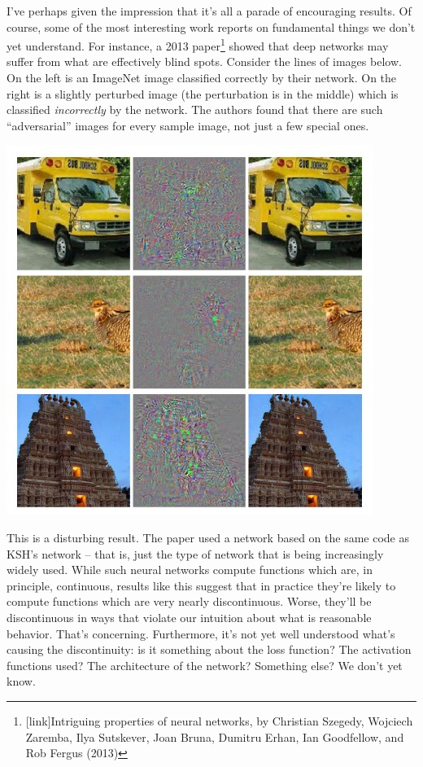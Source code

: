 \documentclass[a4paper,twoside,10pt]{book}
\begin{document}
I've perhaps given the impression that it's all a parade of encouraging results. Of course, some of the most interesting work reports on fundamental things we don't yet understand. For instance, a 2013 paper\footnote{[link]Intriguing properties of neural networks, by Christian Szegedy, Wojciech Zaremba, Ilya Sutskever, Joan Bruna, Dumitru Erhan, Ian Goodfellow, and Rob Fergus (2013)} showed that deep networks may suffer from what are effectively blind spots. Consider the lines of images below. On the left is an ImageNet image classified correctly by their network. On the right is a slightly perturbed image (the perturbation is in the middle) which is classified \textit{incorrectly} by the network. The authors found that there are such ``adversarial'' images for every sample image, not just a few special ones.
\begin{center}
	\includegraphics[width=0.55\linewidth]{figures/ch6/adversarial}
\end{center}
This is a disturbing result. The paper used a network based on the same code as KSH's network -- that is, just the type of network that is being increasingly widely used. While such neural networks compute functions which are, in principle, continuous, results like this suggest that in practice they're likely to compute functions which are very nearly discontinuous. Worse, they'll be discontinuous in ways that violate our intuition about what is reasonable behavior. That's concerning. Furthermore, it's not yet well understood what's causing the discontinuity: is it something about the loss function? The activation functions used? The architecture of the network? Something else? We don't yet know.
\end{document}
